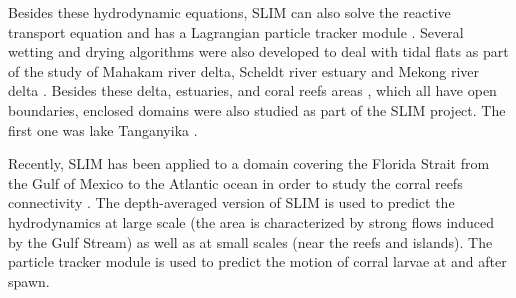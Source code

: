  Besides these hydrodynamic equations, SLIM can also solve the reactive transport equation \citep{gourgue2013depth,deBrauwere2014integrated} and has a Lagrangian particle tracker module \citep{thomas2014numerical, critchell2016modelling}. Several wetting and drying algorithms were also developed \citet{gourgue2009flux,karna2011fully,le2018new}
to deal with tidal flats as part of the study of Mahakam river delta, Scheldt river estuary and Mekong river delta \citep{le2018new,le2019implicit}. Besides these delta, estuaries, and coral reefs areas \citep{legrand2006high,lambrechts2008multi,frys2018fine}, which all have open boundaries, enclosed domains were also studied as part of the SLIM project. The first one was lake Tanganyika \citep{gourgue2007toward,gourgue2011free,delandmeter2018fully}. %

Recently, SLIM has been applied to a domain covering the Florida Strait from the Gulf of Mexico to the Atlantic ocean in order to study the corral reefs connectivity \citep{frys2018fine}. The depth-averaged version of SLIM is used to predict the hydrodynamics at large scale (the area is characterized by strong flows induced by the Gulf Stream) as well as at small scales (near the reefs and islands). The particle tracker module is used to predict the motion of corral larvae at and after spawn. %




